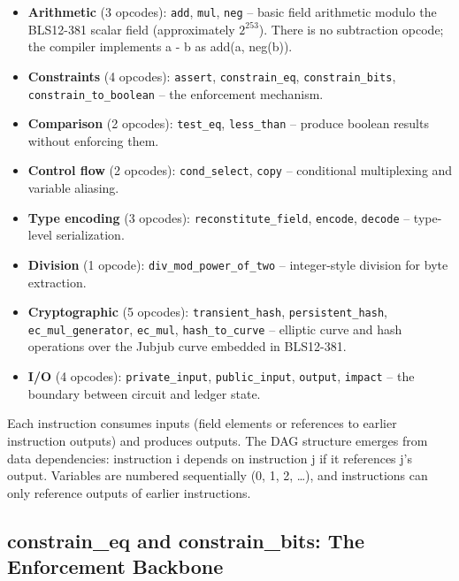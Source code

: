 \documentclass[
  11pt,
  openany]{report}
\providecommand{\tightlist}{%
  \setlength{\itemsep}{0pt}\setlength{\parskip}{0pt}}
\renewcommand{\textbf}[1]{{\bfseries\color{MidnightBold}#1}}
\begin{document}
\begin{itemize}
\tightlist
\item
  \textbf{Arithmetic} (3 opcodes): \texttt{add}, \texttt{mul}, \texttt{neg} --
  basic field arithmetic modulo the BLS12-381 scalar field (approximately
  \(2^{253}\)). There is no subtraction opcode; the compiler implements a - b as
  add(a, neg(b)).
\item
  \textbf{Constraints} (4 opcodes): \texttt{assert}, \texttt{constrain\_eq},
  \texttt{constrain\_bits}, \texttt{constrain\_to\_boolean} -- the enforcement
  mechanism.
\item
  \textbf{Comparison} (2 opcodes): \texttt{test\_eq}, \texttt{less\_than} --
  produce boolean results without enforcing them.
\item
  \textbf{Control flow} (2 opcodes): \texttt{cond\_select}, \texttt{copy} --
  conditional multiplexing and variable aliasing.
\item
  \textbf{Type encoding} (3 opcodes): \texttt{reconstitute\_field},
  \texttt{encode}, \texttt{decode} -- type-level serialization.
\item
  \textbf{Division} (1 opcode): \texttt{div\_mod\_power\_of\_two} --
  integer-style division for byte extraction.
\item
  \textbf{Cryptographic} (5 opcodes): \texttt{transient\_hash},
  \texttt{persistent\_hash}, \texttt{ec\_mul\_generator}, \texttt{ec\_mul},
  \texttt{hash\_to\_curve} -- elliptic curve and hash operations over the Jubjub
  curve embedded in BLS12-381.
\item
  \textbf{I/O} (4 opcodes): \texttt{private\_input}, \texttt{public\_input},
  \texttt{output}, \texttt{impact} -- the boundary between circuit and ledger
  state.
\end{itemize}

Each instruction consumes inputs (field elements or references to earlier
instruction outputs) and produces outputs. The DAG structure emerges from data
dependencies: instruction i depends on instruction j if it references j's
output. Variables are numbered sequentially (0, 1, 2, \ldots), and instructions
can only reference outputs of earlier instructions.

\subsection{constrain\_eq and constrain\_bits: The Enforcement
Backbone}\label{constrain_eq-and-constrain_bits-the-enforcement-backbone}
\end{document}
